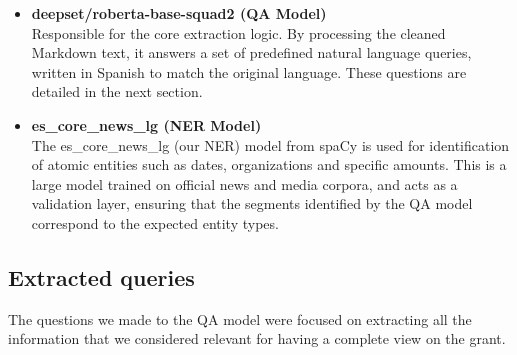 \documentclass{article}
\begin{document}
\begin{itemize}
\item \textbf{deepset/roberta-base-squad2 (QA Model)} \\
Responsible for the core extraction logic. By processing the cleaned Markdown text, it answers a set of predefined natural language queries, written in Spanish to match the original language. These questions are detailed in the next section.

\item \textbf{es\_core\_news\_lg (NER Model)} \\
The es\_core\_news\_lg (our NER) model from spaCy is used for identification of atomic entities such as dates, organizations and specific amounts. This is a large model trained on official news and media corpora, and acts as a validation layer, ensuring that the segments identified by the QA model correspond to the expected entity types.
\end{itemize}

\subsection{Extracted queries}
The questions we made to the QA model were focused on extracting all the information that we considered relevant for having a complete view on the grant.
\end{document}
